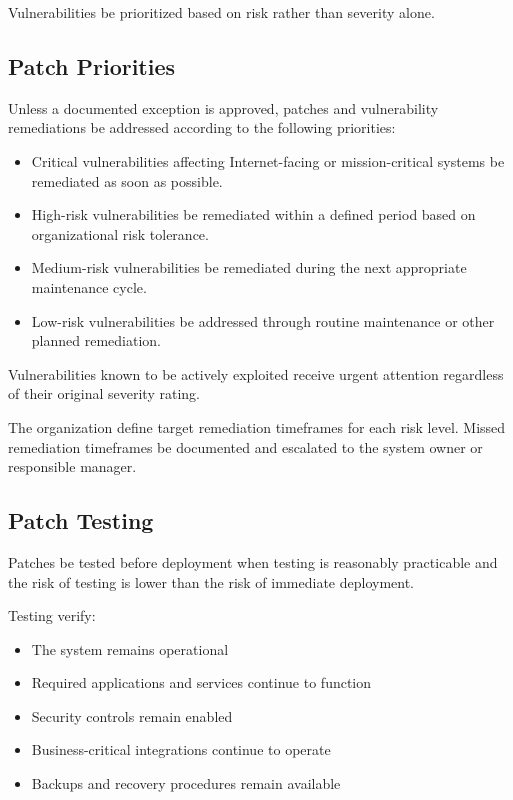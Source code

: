 Vulnerabilities \must{} be prioritized based on risk rather than severity alone.

\subsection{Patch Priorities}

Unless a documented exception is approved, patches and vulnerability remediations \should{} be addressed according to the following priorities:
\begin{itemize}
    \item Critical vulnerabilities affecting Internet-facing or mission-critical systems \should{} be remediated as soon as possible.
    \item High-risk vulnerabilities \should{} be remediated within a defined period based on organizational risk tolerance.
    \item Medium-risk vulnerabilities \should{} be remediated during the next appropriate maintenance cycle.
    \item Low-risk vulnerabilities \should{} be addressed through routine maintenance or other planned remediation.
\end{itemize}

Vulnerabilities known to be actively exploited \must{} receive urgent attention regardless of their original severity rating.

The organization \must{} define target remediation timeframes for each risk level. Missed remediation timeframes \must{} be documented and escalated to the system owner or responsible manager.

\subsection{Patch Testing}

Patches \should{} be tested before deployment when testing is reasonably practicable and the risk of testing is lower than the risk of immediate deployment.

Testing \should{} verify:
\begin{itemize}
    \item The system remains operational
    \item Required applications and services continue to function
    \item Security controls remain enabled
    \item Business-critical integrations continue to operate
    \item Backups and recovery procedures remain available
\end{itemize}

